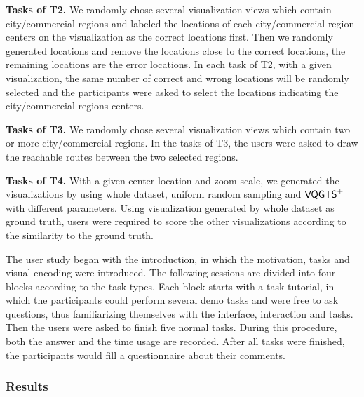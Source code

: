 \textbf{Tasks of T2.} We randomly chose several visualization views which contain city/commercial regions and labeled the locations of each city/commercial region centers on the visualization as the correct locations first.  Then we randomly generated locations and remove the locations close to the correct locations, the remaining locations are the error locations. In each task of T2, with a given visualization, the same number of correct and wrong locations will be randomly selected and the participants were asked to select the locations indicating the city/commercial regions centers.

\textbf{Tasks of T3.} We randomly chose several visualization views which contain two or more city/commercial regions. In the tasks of T3, the users were asked to draw the reachable routes between the two selected regions.

\textbf{Tasks of T4.} With a given center location and zoom scale, we generated the visualizations by using whole dataset, uniform random sampling and $\mathsf{VQGTS}^{+}$ with different parameters. Using visualization generated by whole dataset as ground truth, users were required to score the other visualizations according to the similarity to the ground truth.

The user study began with the introduction, in which the motivation, tasks and visual encoding were introduced. The following sessions are divided into four blocks according to the task types. Each block starts with a task tutorial, in which the participants could perform several demo tasks and were free to ask questions, thus familiarizing themselves with the interface, interaction and tasks.
Then the users were asked to finish five normal tasks. During this procedure, both the answer and the time usage are recorded.
After all tasks were finished, the participants would fill a questionnaire about their comments.

\subsubsection{Results}



